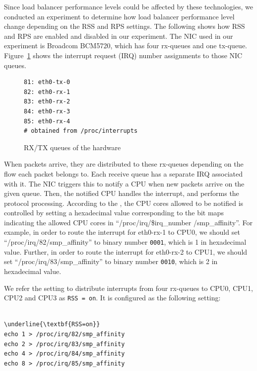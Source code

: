 Since load balancer performance levels could be affected by these technologies,
we conducted an experiment to determine how load balancer performance level change depending on the RSS and RPS settings.
The following shows how RSS and RPS are enabled and disabled in our experiment. 
The NIC used in our experiment is Broadcom BCM5720, which has four rx-queues and one tx-queue.
Figure~\ref{fig:rx-queue} shows the interrupt request (IRQ) number assignments to those NIC queues.

\begin{figure}
\begin{minipage}{0.7\columnwidth}
\small
\begin{verbatim}
81: eth0-tx-0
82: eth0-rx-1
83: eth0-rx-2
84: eth0-rx-3
85: eth0-rx-4
# obtained from /proc/interrupts 
\end{verbatim}
\end{minipage}
\caption{RX/TX queues of the hardware}
\label{fig:rx-queue}
\end{figure}

When packets arrive, they are distributed to these rx-queues depending on the flow each packet belongs to.
Each receive queue has a separate IRQ associated with it. The NIC triggers
this to notify a CPU when new packets arrive on the given queue.
Then, the notified CPU handles the interrupt, and performs the protocol processing. 
According to the \cite{TomHerbert}, the CPU cores allowed to be notified is controlled by setting 
a hexadecimal value corresponding to the bit maps indicating the allowed CPU cores in \enquote{/proc/irq/\$irq\_number /smp\_affinity}.
%
For example, in order to route the interrupt for eth0-rx-1 to CPU0, 
we should set \enquote{/proc/irq/82/smp\_affinity} 
to binary number {\tt 0001}, which is 1 in hexadecimal value.
Further, in order to route the interrupt for eth0-rx-2 to CPU1, we 
should set \enquote{/proc/irq/83/smp\_affinity} 
to binary number {\tt 0010}, which is 2 in hexadecimal value.

We refer the setting to distribute interrupts from four rx-queues to CPU0, CPU1, CPU2 and CPU3 as {\tt RSS = on}. 
It is configured as the following setting: 

\begin{center}
\begin{minipage}{0.8\columnwidth}
\begin{Verbatim}[commandchars=\\\{\}]

\underline{\textbf{RSS=on}}
echo 1 > /proc/irq/82/smp_affinity
echo 2 > /proc/irq/83/smp_affinity
echo 4 > /proc/irq/84/smp_affinity
echo 8 > /proc/irq/85/smp_affinity

\end{Verbatim}
\end{minipage}
\end{center}

